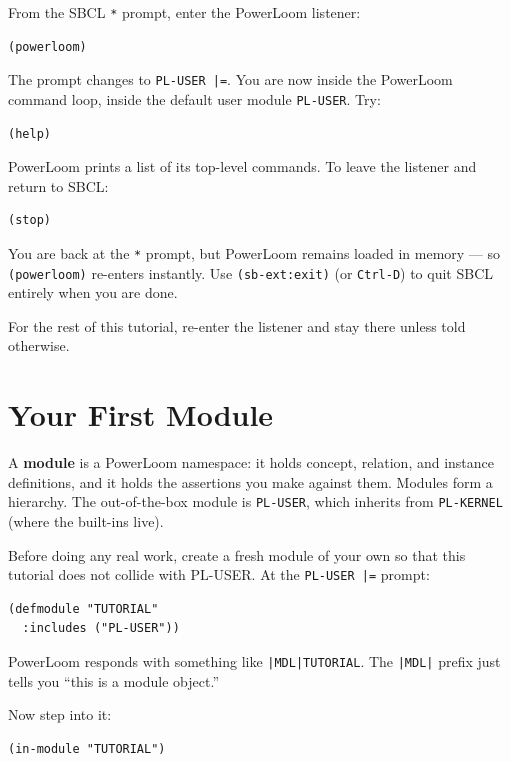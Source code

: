 \documentclass[11pt,letterpaper]{article}
\newcommand{\cmd}[1]{\texttt{#1}}
\newcommand{\prompt}[1]{\textcolor{plprompt}{\texttt{#1}}}
\begin{document}
From the SBCL \prompt{*} prompt, enter the PowerLoom listener:

\begin{lstlisting}
(powerloom)
\end{lstlisting}

\noindent The prompt changes to \prompt{PL-USER |=}. You are now inside the
PowerLoom command loop, inside the default user module \cmd{PL-USER}. Try:

\begin{lstlisting}
(help)
\end{lstlisting}

\noindent PowerLoom prints a list of its top-level commands. To leave the
listener and return to SBCL:

\begin{lstlisting}
(stop)
\end{lstlisting}

\noindent You are back at the \prompt{*} prompt, but PowerLoom remains
loaded in memory --- so \cmd{(powerloom)} re-enters instantly. Use
\cmd{(sb-ext:exit)} (or \cmd{Ctrl-D}) to quit SBCL entirely when you are
done.

For the rest of this tutorial, re-enter the listener and stay there unless
told otherwise.

\section{Your First Module}
\label{sec:modules}

A \textbf{module} is a PowerLoom namespace: it holds concept, relation, and
instance definitions, and it holds the assertions you make against them.
Modules form a hierarchy. The out-of-the-box module is \cmd{PL-USER}, which
inherits from \cmd{PL-KERNEL} (where the built-ins live).

Before doing any real work, create a fresh module of your own so that this
tutorial does not collide with PL-USER. At the \prompt{PL-USER |=} prompt:

\begin{lstlisting}
(defmodule "TUTORIAL"
  :includes ("PL-USER"))
\end{lstlisting}

\noindent PowerLoom responds with something like \cmd{|MDL|TUTORIAL}. The
\cmd{|MDL|} prefix just tells you ``this is a module object.''

Now step into it:

\begin{lstlisting}
(in-module "TUTORIAL")
\end{lstlisting}
\end{document}

